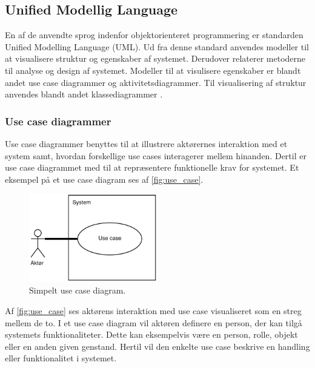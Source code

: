 \subsection{Unified Modellig Language}
En af de anvendte sprog indenfor objektorienteret programmering er standarden Unified Modelling Language (UML). Ud fra denne standard anvendes modeller til at visualisere struktur og egenskaber af systemet. Derudover relaterer metoderne til analyse og design af systemet. Modeller til at visulisere egenskaber er blandt andet use case diagrammer og aktivitetsdiagrammer. Til visualisering af struktur anvendes blandt andet klassediagrammer \cite{Fowler2004, Williams2004}.


\subsubsection{Use case diagrammer} 
Use case diagrammer benyttes til at illustrere aktørernes interaktion med et system samt, hvordan forskellige use cases interagerer mellem hinanden. Dertil er use case diagrammet med til at repræsentere funktionelle krav for systemet. \cite{Williams2004} Et eksempel på et use case diagram ses af \autoref{fig:use_case}.

\begin{figure} [H]
\centering
\includegraphics[width=0.5\textwidth]{figures/USE_CASE2}
\caption{Simpelt use case diagram.}
\label{fig:use_case}
\end{figure}

\noindent
Af \autoref{fig:use_case} ses aktørens interaktion med use case visualiseret som en streg mellem de to. I et use case diagram vil aktøren definere en person, der kan tilgå systemets funktionaliteter. Dette kan eksempelvis være en person, rolle, objekt eller en anden given genstand. Hertil vil den enkelte use case beskrive en handling eller funktionalitet i systemet.\cite{Fowler2004, Williams2004}


